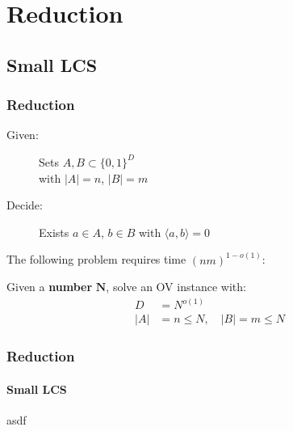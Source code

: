 \section{Reduction}
\subsection{Small LCS}


\begin{frame}[t]
	\frametitle{Reduction}
	
	\begin{definition}
		\begin{description}
			\item[Given:] Sets $A, B \subset \{0,1\}^D$ \\
				with $|A| = n$, $|B| = m$ 
			
			\item[Decide:] Exists $a \in A$, $b \in B$ with $\langle a,b\rangle = 0$
		\end{description}				
	\end{definition}
	
	\begin{definition}
		The following problem requires time $(n  m)^{1-o(1)}$:
		
		Given a \textbf{number} $\mathbf{N}$, solve an OV instance with:	
\begin{align*} 
	D &= N^{o(1)} \\ 
	|A| &= n \leq N,\quad |B| = m \leq N
\end{align*}
  	\end{definition}
  	

\end{frame}


\begin{frame}[t]
\frametitle{Reduction}
  \framesubtitle{Small LCS}

asdf
\end{frame}